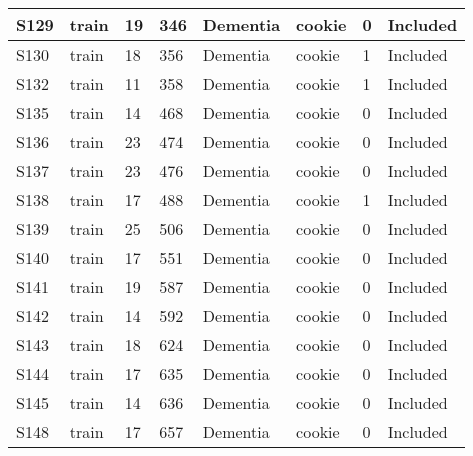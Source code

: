 \begin{center}
\begin{longtable}{|l|l|l|l|l|l|l|l|}
S129           & train                 & 19              & 346     & Dementia       & cookie          & 0            & Included      \\ \hline
S130           & train                 & 18              & 356     & Dementia       & cookie          & 1            & Included      \\ \hline
S132           & train                 & 11              & 358     & Dementia       & cookie          & 1            & Included      \\ \hline
S135           & train                 & 14              & 468     & Dementia       & cookie          & 0            & Included      \\ \hline
S136           & train                 & 23              & 474     & Dementia       & cookie          & 0            & Included      \\ \hline
S137           & train                 & 23              & 476     & Dementia       & cookie          & 0            & Included      \\ \hline
S138           & train                 & 17              & 488     & Dementia       & cookie          & 1            & Included      \\ \hline
S139           & train                 & 25              & 506     & Dementia       & cookie          & 0            & Included      \\ \hline
S140           & train                 & 17              & 551     & Dementia       & cookie          & 0            & Included      \\ \hline
S141           & train                 & 19              & 587     & Dementia       & cookie          & 0            & Included      \\ \hline
S142           & train                 & 14              & 592     & Dementia       & cookie          & 0            & Included      \\ \hline
S143           & train                 & 18              & 624     & Dementia       & cookie          & 0            & Included      \\ \hline
S144           & train                 & 17              & 635     & Dementia       & cookie          & 0            & Included      \\ \hline
S145           & train                 & 14              & 636     & Dementia       & cookie          & 0            & Included      \\ \hline
S148           & train                 & 17              & 657     & Dementia       & cookie          & 0            & Included      \\ \hline

\end{longtable}
\end{center}
